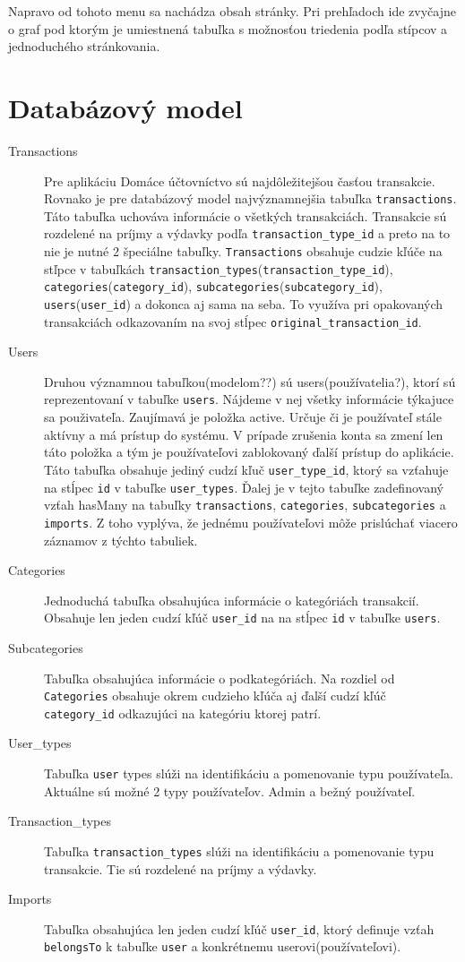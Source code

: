 \documentclass[12pt,onesided]{book}
\begin{document}
Napravo od tohoto menu sa nachádza obsah stránky. Pri prehľadoch ide zvyčajne o graf pod ktorým je umiestnená tabuľka s možnosťou triedenia podľa stípcov a jednoduchého stránkovania.


\section{Databázový model}
\begin{description}
\item [Transactions]
Pre aplikáciu Domáce účtovníctvo sú najdôležitejšou časťou transakcie. Rovnako je pre databázový model najvýznamnejšia tabuľka \texttt{transactions}. Táto tabuľka uchováva informácie o všetkých transakciách. Transakcie sú rozdelené na príjmy a výdavky podľa \texttt{transaction\_type\_id} a preto na to nie je nutné 2 špeciálne tabuľky. \texttt{Transactions} obsahuje cudzie kľúče na stľpce v tabuľkách \texttt{transaction\_types}(\texttt{transaction\_type\_id}), \texttt{categories}(\texttt{category\_id}), \texttt{subcategories}(\texttt{subcategory\_id}), \texttt{users}(\texttt{user\_id}) a dokonca aj sama na seba. To využíva pri opakovaných transakciách odkazovaním na svoj stĺpec \texttt{original\_transaction\_id}.
\item [Users]
Druhou významnou tabuľkou(modelom??) sú users(používatelia?), ktorí sú reprezentovaní v tabuľke \texttt{users}. Nájdeme v nej všetky informácie týkajuce sa použivateľa. Zaujímavá je položka active. Určuje či je používateľ stále aktívny a má prístup do systému. V prípade zrušenia konta sa zmení len táto položka a tým je používateľovi zablokovaný ďalší prístup do aplikácie. Táto tabuľka obsahuje jediný cudzí kľuč \texttt{user\_type\_id}, ktorý sa vzťahuje na stĺpec \texttt{id} v tabuľke \texttt{user\_types}. Ďalej je v tejto tabuľke zadefinovaný vzťah hasMany na tabuľky \texttt{transactions}, \texttt{categories}, \texttt{subcategories} a \texttt{imports}. Z toho vyplýva, že jednému používateľovi môže prislúchať viacero záznamov z týchto tabuliek.
\item [Categories]
Jednoduchá tabuľka obsahujúca informácie o kategóriách transakcií. Obsahuje len jeden cudzí kľúč \texttt{user\_id} na na stĺpec \texttt{id} v tabuľke \texttt{users}. 
\item [Subcategories]
Tabuľka obsahujúca informácie o podkategóriách. Na rozdiel od \texttt{Categories} obsahuje okrem cudzieho kľúča aj ďalší cudzí kľúč \texttt{category\_id} odkazujúci na kategóriu ktorej patrí.
\item [{User\_types}] 
Tabuľka \texttt{user} types slúži na identifikáciu a pomenovanie typu používateľa. Aktuálne sú možné 2 typy používateľov. Admin a bežný používateľ.
\item [{Transaction\_types}] 
Tabuľka \texttt{transaction\_types} slúži na identifikáciu a pomenovanie typu transakcie. Tie sú rozdelené na príjmy a výdavky.
\item [Imports]  
Tabuľka obsahujúca len jeden cudzí kľúč \texttt{user\_id}, ktorý definuje vzťah \texttt{belongsTo} k tabuľke \texttt{user} a konkrétnemu userovi(používateľovi).
\end{description}
\end{document}
